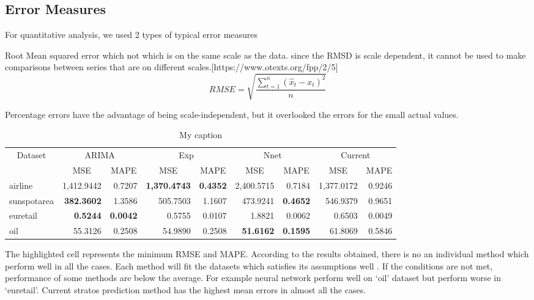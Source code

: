 
\subsection{Error Measures}

For quantitative analysis, we used 2 types of  typical error measures 

Root Mean squared error which  not which is on the same scale as the data. since the RMSD is scale dependent, it cannot be used to make comparisons between series that are on different scales.[https://www.otexts.org/fpp/2/5]
$$RMSE=\sqrt{\frac{\sum_{t=1}^{n}(\hat{x}_{t}-x_{t})^{2}}{n}}$$


Percentage errors have the advantage of being scale-independent, but it overlooked the errors for the small actual values.

\begin{table}[]
\centering
\caption{My caption}
\begin{tabular}{|l|r|r|r|r|r|r|r|r|}
\hline
\multicolumn{1}{|c|}{\multirow{2}{*}{Dataset}} & \multicolumn{2}{c|}{ARIMA} & \multicolumn{2}{c|}{Exp} & \multicolumn{2}{c|}{Nnet} & \multicolumn{2}{c|}{Current} \\ \cline{2-9} 
\multicolumn{1}{|c|}{} & \multicolumn{1}{c|}{MSE} & \multicolumn{1}{c|}{MAPE} & \multicolumn{1}{c|}{MSE} & \multicolumn{1}{c|}{MAPE} & \multicolumn{1}{c|}{MSE} & \multicolumn{1}{c|}{MAPE} & \multicolumn{1}{c|}{MSE} & \multicolumn{1}{c|}{MAPE} \\ \hline
airline & 1,412.9442 & 0.7207 & \textbf{1,370.4743} & \textbf{0.4352} & 2,400.5715 & 0.7184 & 1,377.0172 & 0.9246 \\ \hline
sunspotarea & \textbf{382.3602} & 1.3586 & 505.7503 & 1.1607 & 473.9241 & \textbf{0.4652} & 546.9379 & 0.9651 \\ \hline
euretail & \textbf{0.5244} & \textbf{0.0042} & 0.5755 & 0.0107 & 1.8821 & 0.0062 & 0.6503 & 0.0049 \\ \hline
oil & 55.3126 & 0.2508 & 54.9890 & 0.2508 & \textbf{51.6162} & \textbf{0.1595} & 61.8069 & 0.5846 \\ \hline
\end{tabular}
\end{table}


The highlighted cell represents the minimum RMSE and MAPE. According to the results obtained, there is no an individual method which perform well in all the cases. Each method will fit the datasets which satisfies its assumptions well . If the conditions are not met, performance of some methods are below the average. For example neural network perform well on ‘oil’ dataset but perform worse in ‘euretail’.  Current stratos prediction method has the highest mean errors in almost all the cases.

